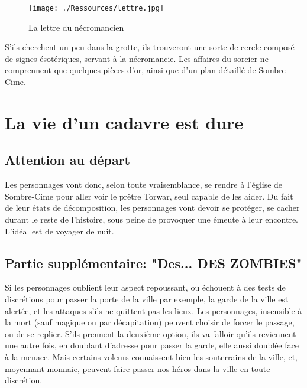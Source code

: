 \documentclass[a4paper, 11pt]{article}
\begin{document}
\begin{figure}[p]
\begin{center}
\hypertarget{lettre}{}
\texttt{[image: ./Ressources/lettre.jpg]}
\caption{La lettre du nécromancien}
\end{center}
\end{figure}
S'ils cherchent un peu dans la grotte, ils trouveront une sorte de cercle composé de signes ésotériques, servant à la nécromancie. Les affaires du sorcier ne comprennent que quelques pièces d'or, ainsi que d'un plan détaillé de Sombre-Cime.

\section{La vie d'un cadavre est dure}
\subsection{Attention au départ}
Les personnages vont donc, selon toute vraisemblance, se rendre à l'église de Sombre-Cime pour aller voir le prêtre Torwar, seul capable de les aider.
Du fait de leur états de décomposition, les personnages vont devoir se protéger, se cacher durant le reste de l'histoire, sous peine de provoquer une émeute à leur encontre. L'idéal est de voyager de nuit.
\subsection{Partie supplémentaire: "Des... DES ZOMBIES"} 
Si les personnages oublient leur aspect repoussant, ou échouent à des tests de discrétions pour passer la porte de la ville par exemple, la garde de la ville est alertée, et les attaques s'ils ne quittent pas les lieux. Les personnages, insensible à la mort (sauf magique ou par décapitation) peuvent choisir de forcer le passage, ou de se replier. S'ils prennent la deuxième option, ils va falloir qu'ils reviennent une autre fois, en doublant d'adresse pour passer la garde, elle aussi doublée face à la menace.
\newline
Mais certains voleurs connaissent bien les souterrains de la ville, et, moyennant monnaie, peuvent faire passer nos héros dans la ville en toute discrétion.
\end{document}
